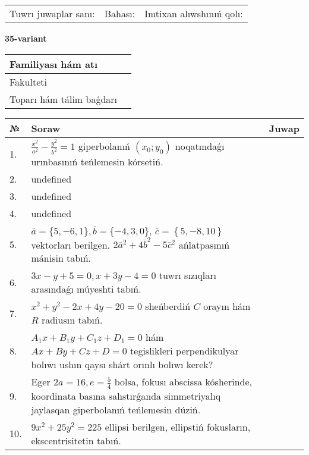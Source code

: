 \documentclass{article}
\begin{document}
\vspace{0.7cm}

\begin{tabular}{lll}
Tuwrı juwaplar sanı: \underline{\hspace{1cm}} & 
Bahası: \underline{\hspace{1cm}} & 
Imtixan alıwshınıń qolı: \underline{\hspace{2cm}} \\
\end{tabular}

\egroup

\newpage


\textbf{35-variant}\\

\bgroup
\def\arraystretch{1.6} %

\begin{tabular}{|m{5.7cm}|m{9.5cm}|}
\hline
Familiyası hám atı & \\
\hline
Fakulteti  & \\
\hline
Toparı hám tálim baǵdarı  & \\
\hline
\end{tabular}

\vspace{0.7cm}

\begin{tabular}{|m{0.7cm}|m{10cm}|m{4cm}|}
\hline
№ & Soraw & Juwap \\
\hline
1. & \(\frac{x^{2}}{a^{2}} - \frac{y^{2}}{b^{2}} = 1\) giperbolanıń \((x_{0};y_{0})\) noqatındaǵı urınbasınıń teńlemesin kórsetiń. &  \\
\hline
2. & undefined &  \\
\hline
3. & undefined &  \\
\hline
4. & undefined &  \\
\hline
5. & \(\overline{a} = \{5,- 6, 1 \}, \overline{b} = \{ - 4, 3, 0 \} \), \(\overline{c} = \left\{ 5,- 8, 10 \right\}\) vektorları berilgen. \(2{\bar{a}}^{2} + 4{\bar{b}}^{2} - 5{\bar{c}}^{2}\) ańlatpasınıń mánisin tabıń. &  \\
\hline
6. & \(3 x - y + 5 = 0, x + 3 y - 4 = 0\) tuwrı sızıqları arasındaǵı múyeshti tabıń. &  \\
\hline
7. & \(x^{2} + y^{2} - 2 x + 4 y - 20 = 0\) sheńberdiń \(C\) orayın hám \(R\) radiusın tabıń. &  \\
\hline
8. & \(A_{1}x + B_{1}y + C_{1}z + D_{1} = 0\) hám \(Ax + By + Cz + D = 0\) tegislikleri perpendikulyar bolıwı ushın qaysı shárt orınlı bolıwı kerek? &  \\
\hline
9. & Eger \(2 a = 16, e = \frac{5}{4}\) bolsa, fokusı abscissa kósherinde, koordinata basına salıstırǵanda simmetriyalıq jaylasqan giperbolanıń teńlemesin dúziń. &  \\
\hline
10. & \(9 x^{2} + 25 y^{2} = 225\) ellipsi berilgen, ellipstiń fokusların, ekscentrisitetin tabıń. & \\
\hline
\end{tabular}
\end{document}
